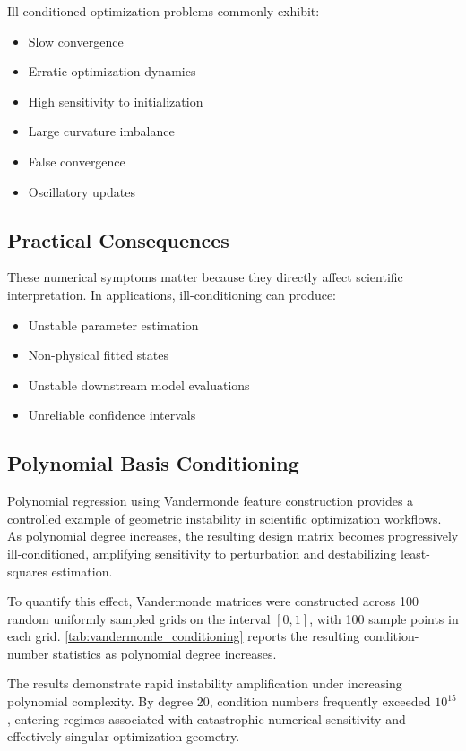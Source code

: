 Ill-conditioned optimization problems commonly exhibit:

\begin{itemize}
    \item Slow convergence
    \item Erratic optimization dynamics
    \item High sensitivity to initialization
    \item Large curvature imbalance
    \item False convergence
    \item Oscillatory updates
\end{itemize}

\subsection{Practical Consequences}

These numerical symptoms matter because they directly affect scientific interpretation. In applications, ill-conditioning can produce:

\begin{itemize}
    \item Unstable parameter estimation
    \item Non-physical fitted states
    \item Unstable downstream model evaluations
    \item Unreliable confidence intervals
\end{itemize}

\subsection{Polynomial Basis Conditioning}

Polynomial regression using Vandermonde feature construction provides a controlled example of geometric instability in scientific optimization workflows. As polynomial degree increases, the resulting design matrix becomes progressively ill-conditioned, amplifying sensitivity to perturbation and destabilizing least-squares estimation.

To quantify this effect, Vandermonde matrices were constructed across 100 random uniformly sampled grids on the interval $[0,1]$, with 100 sample points in each grid. \cref{tab:vandermonde_conditioning} reports the resulting condition-number statistics as polynomial degree increases.

The results demonstrate rapid instability amplification under increasing polynomial complexity. By degree 20, condition numbers frequently exceeded $10^{15}$, entering regimes associated with catastrophic numerical sensitivity and effectively singular optimization geometry.

